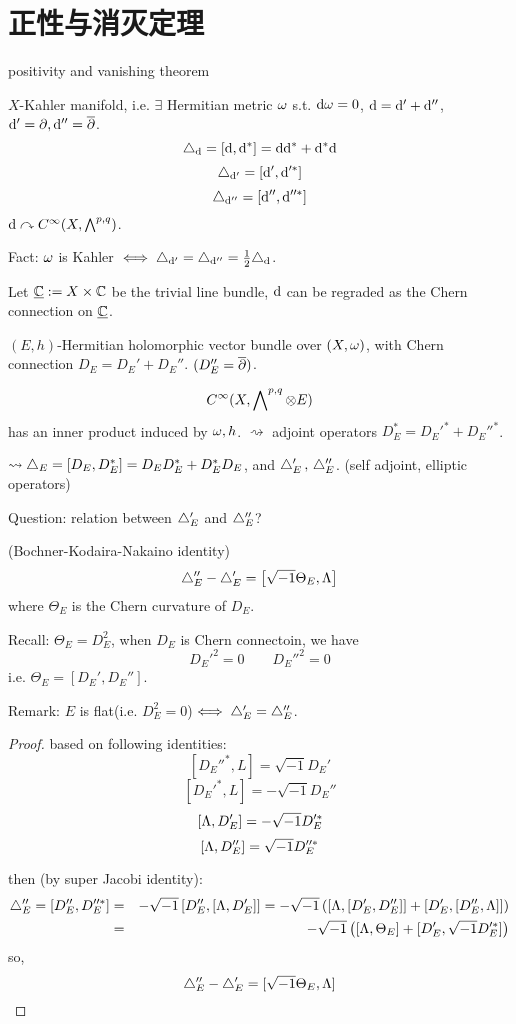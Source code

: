 \chapter{正性与消灭定理}
positivity and vanishing theorem

$X$-Kahler manifold, i.e. $\exists$ Hermitian metric $\omega$ s.t. $\mathrm{d}\omega=0$,
$\mathrm{d}=\mathrm{d}'+\mathrm{d}''$, $\mathrm{d}'=\partial,\mathrm{d}''=\overline{\partial}$.
$$\triangle_{\mathrm{d}}=[\mathrm{d},\mathrm{d}^*]=\mathrm{d}\mathrm{d}^*+\mathrm{d}^*\mathrm{d}$$
$$\triangle_{\mathrm{d}'}=[\mathrm{d}',\mathrm{d}'^*]$$
$$\triangle_{\mathrm{d}''}=[\mathrm{d}'',\mathrm{d}''^*]$$
$\mathrm{d}\curvearrowright C^{\infty}(X,\bigwedge\nolimits^{p,q})$.

Fact: $\omega$ is Kahler $\iff\triangle_{\mathrm{d}'}=\triangle_{\mathrm{d}''}=\frac{1}{2}\triangle_{\mathrm{d}}$.

Let $\underline{\mathbb{C}}:=X\times\mathbb{C}$ be the trivial line bundle,
$\mathrm{d}$ can be regraded as the Chern connection on $\underline{\mathbb{C}}$.

$(E,h)$-Hermitian holomorphic vector bundle over $(X,\omega)$,
with Chern connection $D_E=D_E'+D_E''$. $(D_E''=\overline{\partial})$.

$$C^\infty(X,\bigwedge\nolimits^{p,q}\otimes E)$$
has an inner product induced by $\omega,h$.
$\rightsquigarrow$ adjoint operators $D_E^*=D_E'^*+D_E''^*$.

$\rightsquigarrow\triangle_E=[D_E,D_E^*]=D_ED_E^*+D_E^*D_E$, and
$\triangle_E'\,,\,\triangle_E''$. (self adjoint, elliptic operators)

Question: relation between $\triangle_E'$ and $\triangle_E''$?

\begin{thm}(Bochner-Kodaira-Nakaino identity)
$$
  \triangle_E''-\triangle_E'
=
  \left[
    \sqrt{-1}
    \Theta_E
  ,
    \Lambda
  \right]
$$
where $\Theta_E$ is the Chern curvature of $D_E$.
\end{thm}

Recall: $\Theta_E=D_E^2$, when $D_E$ is Chern connectoin, we have
$$D_E'^2=0\qquad D_E''^2=0$$
i.e. $\Theta_E=[D_E',D_E'']$.

Remark: $E$ is flat(i.e. $D_E^2=0$)$\iff \triangle_E'=\triangle_E''$.

\begin{proof}
based on following identities:
$$[D_E''^*,L]=\sqrt{-1}D_E'$$
$$[D_E'^*,L]=-\sqrt{-1}D_E''$$
$$[\Lambda,D_E']=-\sqrt{-1}D_E'^*$$
$$[\Lambda,D_E'']=\sqrt{-1}D_E''^*$$

then (by super Jacobi identity):
\begin{eqnarray*}
  \triangle_E''=[D_E'',D_E''^*]
&=&
  -\sqrt{-1}
  \left[
    D_E''
  ,
    [\Lambda,D_E']
  \right]
=
  -\sqrt{-1}
  \left(
    [\Lambda,[D_E',D_E'']]
   +[D_E',[D_E'',\Lambda]]
  \right)\\
&=&
  -\sqrt{-1}
  \left(
    [\Lambda,\Theta_E]
   +[D_E',\sqrt{-1}D_E'^*]
  \right)
\end{eqnarray*}
so,
$$\triangle_E''-\triangle_E'=[\sqrt{-1}\Theta_E,\Lambda]$$
\end{proof}

